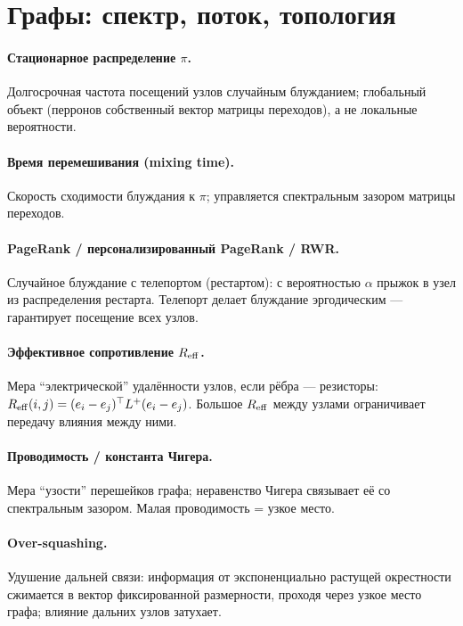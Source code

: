 \section*{Графы: спектр, поток, топология}

\paragraph{Стационарное распределение $\pi$.} Долгосрочная частота посещений
узлов случайным блужданием; глобальный объект (перронов собственный вектор
матрицы переходов), а не локальные вероятности.

\paragraph{Время перемешивания (mixing time).} Скорость сходимости
блуждания к $\pi$; управляется спектральным зазором матрицы переходов.

\paragraph{PageRank / персонализированный PageRank / RWR.} Случайное
блуждание с телепортом (рестартом): с вероятностью $\alpha$ прыжок в узел из
распределения рестарта. Телепорт делает блуждание эргодическим ---
гарантирует посещение всех узлов.

\paragraph{Эффективное сопротивление $R_{\mathrm{eff}}$.} Мера ``электрической''
удалённости узлов, если рёбра --- резисторы:
$R_{\mathrm{eff}}(i,j)=(e_i-e_j)^\top L^{+}(e_i-e_j)$. Большое $R_{\mathrm{eff}}$ между узлами
ограничивает передачу влияния между ними.

\paragraph{Проводимость / константа Чигера.} Мера ``узости'' перешейков
графа; неравенство Чигера связывает её со спектральным зазором. Малая
проводимость = узкое место.

\paragraph{Over-squashing.} Удушение дальней связи: информация от
экспоненциально растущей окрестности сжимается в вектор фиксированной
размерности, проходя через узкое место графа; влияние дальних узлов затухает.


